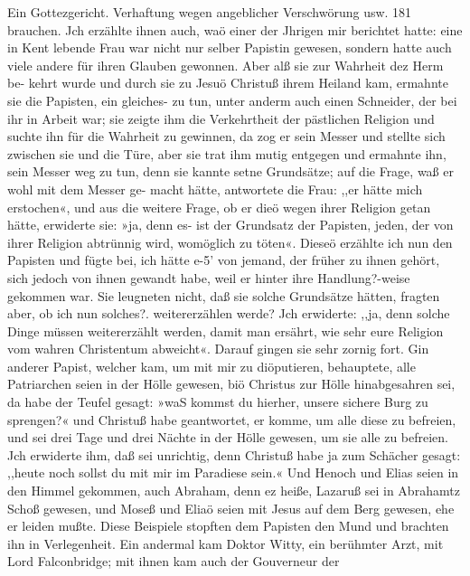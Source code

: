 Ein Gottezgericht. Verhaftung wegen angeblicher Verschwörung usw. 181
brauchen. Jch erzählte ihnen auch, waö einer der Jhrigen mir
berichtet hatte: eine in Kent lebende Frau war nicht nur selber
Papistin gewesen, sondern hatte auch viele andere für ihren
Glauben gewonnen. Aber alß sie zur Wahrheit dez Herm be-
kehrt wurde und durch sie zu Jesuö Christuß ihrem Heiland kam,
ermahnte sie die Papisten, ein gleiches- zu tun, unter anderm
auch einen Schneider, der bei ihr in Arbeit war; sie zeigte ihm
die Verkehrtheit der pästlichen Religion und suchte ihn für die
Wahrheit zu gewinnen, da zog er sein Messer und stellte sich
zwischen sie und die Türe, aber sie trat ihm mutig entgegen und
ermahnte ihn, sein Messer weg zu tun, denn sie kannte setne
Grundsätze; auf die Frage, waß er wohl mit dem Messer ge-
macht hätte, antwortete die Frau: ,,er hätte mich erstochen«, und
aus die weitere Frage, ob er dieö wegen ihrer Religion getan
hätte, erwiderte sie: »ja, denn es- ist der Grundsatz der Papisten,
jeden, der von ihrer Religion abtrünnig wird, womöglich zu töten«.
Dieseö erzählte ich nun den Papisten und fügte bei, ich hätte e-5’
von jemand, der früher zu ihnen gehört, sich jedoch von ihnen
gewandt habe, weil er hinter ihre Handlung?-weise gekommen war.
Sie leugneten nicht, daß sie solche Grundsätze hätten, fragten
aber, ob ich nun solches?. weitererzählen werde? Jch erwiderte:
,,ja, denn solche Dinge müssen weitererzählt werden, damit man
ersährt, wie sehr eure Religion vom wahren Christentum abweicht«.
Darauf gingen sie sehr zornig fort. Gin anderer Papist, welcher
kam, um mit mir zu diöputieren, behauptete, alle Patriarchen seien
in der Hölle gewesen, biö Christus zur Hölle hinabgesahren sei,
da habe der Teufel gesagt: »waS kommst du hierher, unsere sichere
Burg zu sprengen?« und Christuß habe geantwortet, er komme,
um alle diese zu befreien, und sei drei Tage und drei Nächte in
der Hölle gewesen, um sie alle zu befreien. Jch erwiderte ihm,
daß sei unrichtig, denn Christuß habe ja zum Schächer gesagt:
,,heute noch sollst du mit mir im Paradiese sein.« Und Henoch
und Elias seien in den Himmel gekommen, auch Abraham, denn
ez heiße, Lazaruß sei in Abrahamtz Schoß gewesen, und Moseß
und Eliaö seien mit Jesus auf dem Berg gewesen, ehe er leiden
mußte. Diese Beispiele stopften dem Papisten den Mund und
brachten ihn in Verlegenheit.
Ein andermal kam Doktor Witty, ein berühmter Arzt, mit
Lord Falconbridge; mit ihnen kam auch der Gouverneur der


